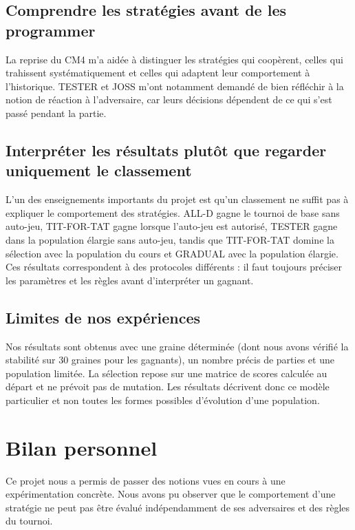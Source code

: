 \documentclass[10pt,a4paper]{article}
\begin{document}
\subsection{Comprendre les stratégies avant de les programmer}
La reprise du CM4 m'a aidée à distinguer les stratégies qui coopèrent, celles qui trahissent systématiquement et celles qui
adaptent leur comportement à l'historique. TESTER et JOSS m'ont notamment demandé de bien réfléchir à la notion de réaction à
l'adversaire, car leurs décisions dépendent de ce qui s'est passé pendant la partie.

\subsection{Interpréter les résultats plutôt que regarder uniquement le classement}
L'un des enseignements importants du projet est qu'un classement ne suffit pas à expliquer le comportement des stratégies.
ALL-D gagne le tournoi de base sans auto-jeu, TIT-FOR-TAT gagne lorsque l'auto-jeu est autorisé, TESTER gagne dans la
population élargie sans auto-jeu, tandis que TIT-FOR-TAT domine la sélection avec la population du cours et GRADUAL avec la population
élargie. Ces résultats correspondent à des protocoles différents : il faut toujours préciser les paramètres et les règles
avant d'interpréter un gagnant.

\subsection{Limites de nos expériences}
Nos résultats sont obtenus avec une graine déterminée (dont nous avons vérifié la stabilité sur 30 graines pour les gagnants),
un nombre précis de parties et une population limitée. La sélection repose sur une matrice de scores calculée au départ et ne
prévoit pas de mutation. Les résultats décrivent donc ce modèle particulier et non toutes les formes possibles d'évolution
d'une population.

\section{Bilan personnel}
Ce projet nous a permis de passer des notions vues en cours à une expérimentation concrète. Nous avons pu observer que le
comportement d'une stratégie ne peut pas être évalué indépendamment de ses adversaires et des règles du tournoi.
\end{document}
